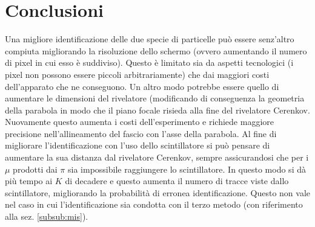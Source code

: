 \documentclass[8pt]{extarticle}
\begin{document}
\section{Conclusioni}
Una migliore identificazione delle due specie di particelle può essere senz'altro compiuta migliorando la risoluzione dello schermo (ovvero aumentando il numero di pixel in cui esso è suddiviso). Questo è limitato sia da aspetti tecnologici (i pixel non possono essere piccoli arbitrariamente) che dai maggiori costi dell'apparato che ne conseguono. Un altro modo potrebbe essere quello di aumentare le dimensioni del rivelatore (modificando di conseguenza la geometria della parabola in modo che il piano focale risieda alla fine del rivelatore Cerenkov. Nuovamente questo aumenta i costi dell'esperimento e richiede maggiore precisione nell'allineamento del fascio con l'asse della parabola. Al fine di migliorare l'identificazione con l'uso dello scintillatore si può pensare di aumentare la sua distanza dal rivelatore Cerenkov, sempre assicurandosi che per i $\mu$ prodotti dai $\pi$ sia impossibile raggiungere lo scintillatore. In questo modo si dà più tempo ai $K$ di decadere e questo aumenta il numero di tracce viste dallo scintillatore, migliorando la probabilità di erronea identificazione. Questo non vale nel caso in cui l'identificazione sia condotta con il terzo metodo (con riferimento alla sez. \ref{subsub:mis}).


\end{document}
